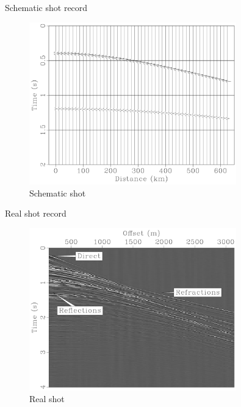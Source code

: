 \documentclass[xcolor=dvipsnames,notes]{beamer}
\begin{document}
%
\begin{frame}{Schematic shot record}
%
\begin{figure}
  \includegraphics[width=0.8\textwidth]{Fig/schemshot.pdf}
  \caption{Schematic shot}
  \label{fig:shot}
\end{figure}
%
\end{frame}
\begin{frame}{Real shot record}
\begin{figure}
  \includegraphics[width=0.8\textwidth]{Fig/shotgath.pdf}
  \caption{Real shot}
  \label{fig:shotgath}
\end{figure}
%
%
\end{frame}
\end{document}
